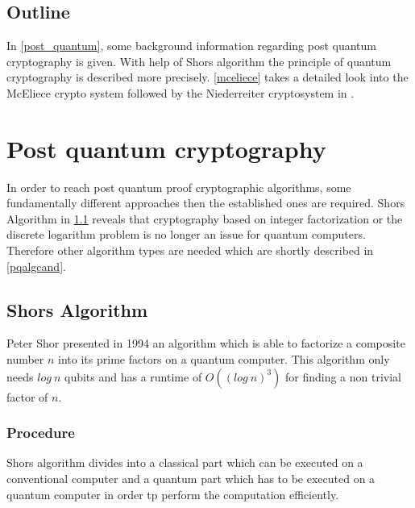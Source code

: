 \subsection*{Outline}
In \autoref{post_quantum}, some background information regarding post quantum cryptography is given. With help of Shors algorithm the principle of quantum cryptography is described more precisely. \autoref{mceliece} takes a detailed look into the McEliece crypto system followed by the Niederreiter cryptosystem in . 


\section{Post quantum cryptography}
\label{post_quantum}
In order to reach post quantum proof cryptographic algorithms, some fundamentally different approaches then the established ones are required. Shors Algorithm in \ref{shoor} reveals that cryptography based on integer factorization or the discrete logarithm problem is no longer an issue for quantum computers. Therefore other algorithm types are needed which are shortly described in \ref{pqalgcand}.   

\subsection{Shors Algorithm}
\label{shoor}
Peter Shor presented in 1994 an algorithm which is able to factorize a composite number $n$ into its prime factors on a quantum computer. This algorithm only needs $log\: n$ qubits and has a runtime of $O((log\: n)^3)$ for finding a non trivial factor of $n$. 

\subsubsection*{Procedure}
Shors algorithm divides into a classical part which can be executed on a conventional computer and a quantum part which has to be executed on a quantum computer in order tp perform the computation efficiently. 

